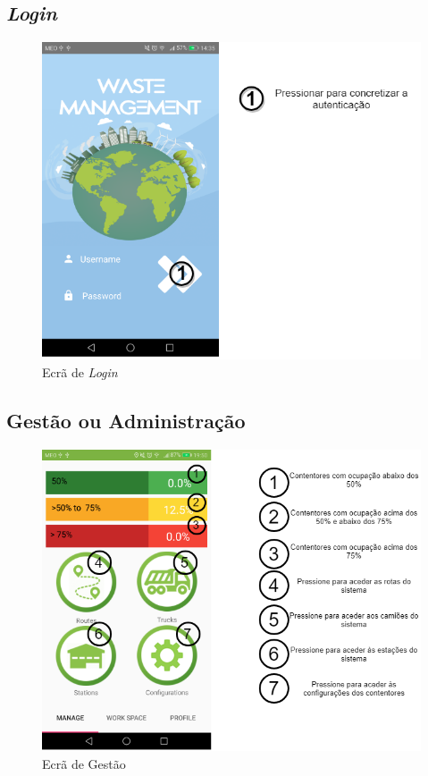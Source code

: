 \documentclass[10pt,a5paper]{article}
\begin{document}
\newpage
\subsection{\textit{Login}} 

\begin{figure}[!h]
	\centering
	\includegraphics[width=1.1\textwidth]{Images/screens/login_screen}
	\caption{Ecrã de \textit{Login}}
	\label{fig:login_screen}
\end{figure}

\newpage
\subsection{Gestão ou Administração} 

\begin{figure}[!h]
	\centering
	\includegraphics[width=1.1\textwidth]{Images/screens/manage_screen_frag}
	\caption{Ecrã de Gestão}
	\label{fig:manage_screen_frag}
\end{figure}
\end{document}
